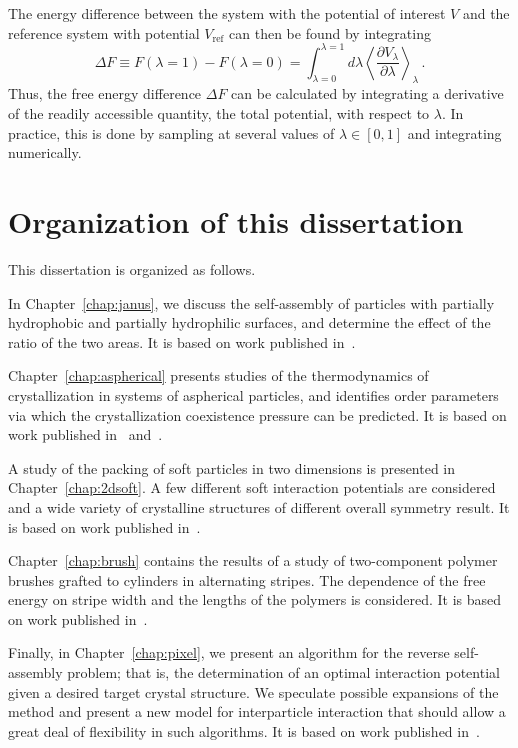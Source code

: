 The energy difference between the system with the potential of interest $V$ and the reference system with potential $V_{\textrm {ref}}$ can then be found by integrating
\begin{equation}
	\Delta F \equiv F(\lambda = 1) - F(\lambda = 0) = \int_{\lambda = 0}^{\lambda = 1} d\lambda \left<\frac{\partial V_\lambda}{\partial \lambda}\right>_\lambda \,. \label{deltaF}
\end{equation}
Thus, the free energy difference $\Delta F$ can be calculated by integrating a derivative of the readily accessible quantity, the total potential, with respect to $\lambda$.
In practice, this is done by sampling at several values of $\lambda \in \left[0,1\right]$ and integrating numerically.

\section{Organization of this dissertation}

This dissertation is organized as follows.

In Chapter~\ref{chap:janus}, we discuss the self-assembly of particles with partially hydrophobic and partially hydrophilic surfaces, and determine the effect of the ratio of the two areas.
It is based on work published in~\cite{cacciuto}.


Chapter~\ref{chap:aspherical} presents studies of the thermodynamics of crystallization in systems of aspherical particles, and identifies order parameters via which the crystallization coexistence pressure can be predicted.
It is based on work published in~\cite{disorder1} and~\cite{disorder2paper}.

A study of the packing of soft particles in two dimensions is presented in Chapter~\ref{chap:2dsoft}.
A few different soft interaction potentials are considered and a wide variety of crystalline structures of different overall symmetry result.
It is based on work published in~\cite{2dsoftpaper}.

Chapter~\ref{chap:brush} contains the results of a study of two-component polymer brushes grafted to cylinders in alternating stripes.
The dependence of the free energy on stripe width and the lengths of the polymers is considered.
It is based on work published in~\cite{brushpaper}.

Finally, in Chapter~\ref{chap:pixel}, we present an algorithm for the reverse self-assembly problem; that is, the determination of an optimal interaction potential given a desired target crystal structure.
We speculate possible expansions of the method and present a new model for interparticle interaction that should allow a great deal of flexibility in such algorithms.
It is based on work published in~\cite{pixelpaper}.


